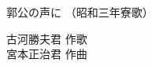 \documentclass[10pt,b5j]{tarticle} %
\begin{document}
\begin{minipage}[c]{0.7\hsize} %
    \begin{center}
        {\LARGE
            郭公の声に %
        }
        {\small 
            （昭和三年寮歌） %
        }
    \end{center}
\end{minipage}
\begin{minipage}[c]{0.3\hsize} %
    \begin{flushright} %
        古河勝夫君 作歌\\宮本正治君 作曲 %
    \end{flushright}
\end{minipage}
\end{document}
